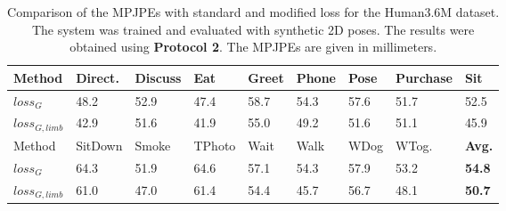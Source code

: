 \begin{table}[bt]	
	\centering
	\begin{tabularx}{\textwidth}{l *{8}{Y}}
		\toprule
		Method & Direct. & Discuss & Eat & Greet & Phone & Pose & Purchase & Sit \\
		\midrule
		$loss_G$ & 48.2 & 52.9 & 47.4 & 58.7 & 54.3 & 57.6 & 51.7 & 52.5\\
		$loss_{G, limb}$ & 42.9 & 51.6 & 41.9 & 55.0 & 49.2 & 51.6 & 51.1 & 45.9 \\
		\bottomrule
		\toprule
		Method & SitDown & Smoke & TPhoto & Wait & Walk & WDog & WTog. & \textbf{Avg.}\\
		\midrule
		$loss_G$ & 64.3 & 51.9 & 64.6 & 57.1 & 54.3 & 57.9 & 53.2 & \textbf{54.8} \\
		$loss_{G, limb}$ & 61.0 & 47.0 & 61.4 & 54.4 & 45.7 & 56.7 & 48.1 & \textbf{50.7} \\
		\bottomrule
	\end{tabularx}
	\caption{
		Comparison of the MPJPEs with standard and modified loss for the Human3.6M dataset.
		The system was trained and evaluated with synthetic 2D poses.
		The results were obtained using \textbf{Protocol 2}. 
		The MPJPEs are given in millimeters.
	 }
	\label{tbl:results-limb-loss}
\end{table}